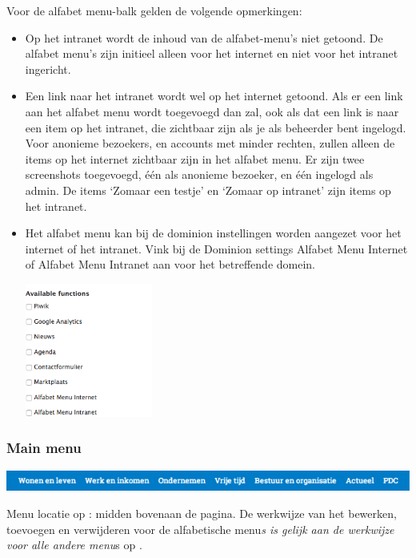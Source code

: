 Voor de alfabet menu-balk gelden de volgende opmerkingen:
\begin{itemize}
\item Op het intranet wordt de inhoud van de alfabet-menu's niet getoond. De alfabet menu's zijn initieel alleen voor het internet en niet voor het intranet ingericht.
\item Een link naar het intranet wordt wel op het internet getoond. Als er een link aan het alfabet menu wordt toegevoegd dan zal, ook als dat een link is naar een item op het intranet, die zichtbaar zijn als je als beheerder bent ingelogd. Voor anonieme bezoekers, en accounts met minder rechten, zullen alleen de items op het internet zichtbaar zijn in het alfabet menu. Er zijn twee screenshots toegevoegd, \'{e}\'{e}n als anonieme bezoeker, en \'{e}\'{e}n ingelogd als admin. De items `Zomaar een testje' en `Zomaar op intranet' zijn items op het intranet.
\item Het alfabet menu kan bij de dominion instellingen worden aangezet voor het internet of het intranet. Vink bij de Dominion settings  Alfabet Menu Internet of Alfabet Menu Intranet aan voor het betreffende domein.
\begin{center}
\includegraphics[width=0.33\textwidth]{img/alfabet-menu-custom-functions.png}
\end{center}
\end{itemize}


\bigskip

\subsubsection{Main menu}\label{mainmenu}

\begin{center}
	\includegraphics[width=\textwidth]{img/menu_main.png}
\end{center}

Menu locatie op \drupalpath{}: midden bovenaan de pagina. De werkwijze van het bewerken, toevoegen en verwijderen voor de alfabetische menu\emph{s is gelijk aan de werkwijze voor alle andere menu}s op \drupalpath{}.


